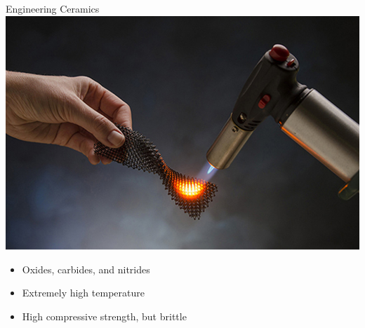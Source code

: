 \documentclass[10pt, svgnames]{beamer}
\begin{document}
\begin{frame}[label={sec:orgb20b15d}]{Engineering Ceramics}
\centering
\includegraphics[height=0.5\textheight]{pictures/ceramic}

\begin{itemize}
\item Oxides, carbides, and nitrides
\item Extremely high temperature
\item High compressive strength, but brittle
\end{itemize}
\end{frame}
\end{document}
